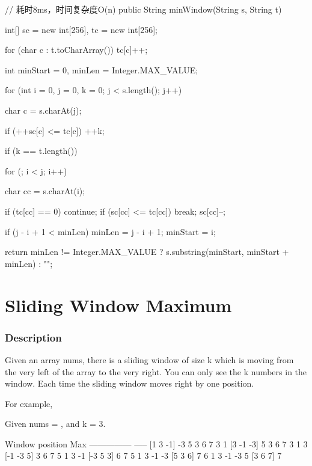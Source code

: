 \begin{Code}
// 耗时8ms，时间复杂度O(n)
public String minWindow(String s, String t) {
    int[] sc = new int[256], tc = new int[256];

    for (char c : t.toCharArray()) {
        tc[c]++;
    }

    int minStart = 0, minLen = Integer.MAX_VALUE;

    for (int i = 0, j = 0, k = 0; j < s.length(); j++) {
        char c = s.charAt(j);

        if (++sc[c] <= tc[c]) {
            ++k;
        }

        if (k == t.length()) {
            for (; i < j; i++) {
                char cc = s.charAt(i);

                if (tc[cc] == 0) {
                    continue;
                }
                if (sc[cc] <= tc[cc]) {
                    break;
                }
                sc[cc]--;
            }

            if (j - i + 1 < minLen) {
                minLen = j - i + 1;
                minStart = i;
            }
        }
    }

    return minLen != Integer.MAX_VALUE ? s.substring(minStart, minStart + minLen) : "";
}
\end{Code}

\newpage

\section{Sliding Window Maximum} %

\subsubsection{Description}
Given an array nums, there is a sliding window of size k which is moving from the very left of the array to the very right. You can only see the k numbers in the window. Each time the sliding window moves right by one position.

For example,

Given nums = \code{[1,3,-1,-3,5,3,6,7]}, and k = 3.

\begin{Code}
Window position                Max
---------------               -----
[1  3  -1] -3  5  3  6  7       3
 1 [3  -1  -3] 5  3  6  7       3
 1  3 [-1  -3  5] 3  6  7       5
 1  3  -1 [-3  5  3] 6  7       5
 1  3  -1  -3 [5  3  6] 7       6
 1  3  -1  -3  5 [3  6  7]      7
\end{Code}

